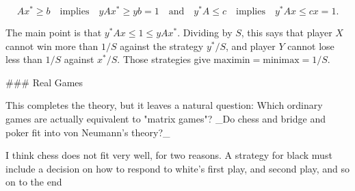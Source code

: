 \[Ax^{*}\geq b\quad\mbox{implies}\quad yAx^{*}\geq yb=1\quad\mbox{and}\quad y^ {*}A\leq c\quad\mbox{implies}\quad y^{*}Ax\leq cx=1.\]

The main point is that \(y^{*}Ax\leq 1\leq yAx^{*}\). Dividing by \(S\), this says that player \(X\) cannot win more than \(1/S\) against the strategy \(y^{*}/S\), and player \(Y\) cannot lose less than \(1/S\) against \(x^{*}/S\). Those strategies give \(\mbox{maximin}=\mbox{minimax}=1/S\).

### Real Games

This completes the theory, but it leaves a natural question: Which ordinary games are actually equivalent to "matrix games"? _Do chess and bridge and poker fit into von Neumann's theory?_

I think chess does not fit very well, for two reasons. A strategy for black must include a decision on how to respond to white's first play, and second play, and so on to the end 